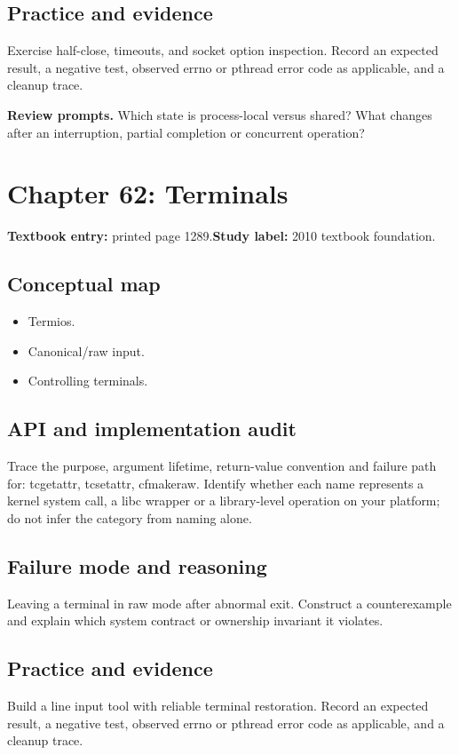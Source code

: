 \documentclass[11pt,letterpaper,oneside]{report}
\begin{document}
\subsection{Practice and evidence}
Exercise half-close, timeouts, and socket option inspection. Record an expected result, a negative test, observed errno or pthread error code as applicable, and a cleanup trace.

\textbf{Review prompts.} Which state is process-local versus shared? What changes after an interruption, partial completion or concurrent operation?

\section{Chapter 62: Terminals}
\textbf{Textbook entry:} printed page 1289.\quad \textbf{Study label:} 2010 textbook foundation.

\subsection{Conceptual map}
\begin{itemize}
\item Termios.
\item Canonical/raw input.
\item Controlling terminals.
\end{itemize}
\subsection{API and implementation audit}
Trace the purpose, argument lifetime, return-value convention and failure path for: tcgetattr, tcsetattr, cfmakeraw. Identify whether each name represents a kernel system call, a libc wrapper or a library-level operation on your platform; do not infer the category from naming alone.

\subsection{Failure mode and reasoning}
Leaving a terminal in raw mode after abnormal exit. Construct a counterexample and explain which system contract or ownership invariant it violates.

\subsection{Practice and evidence}
Build a line input tool with reliable terminal restoration. Record an expected result, a negative test, observed errno or pthread error code as applicable, and a cleanup trace.
\end{document}

